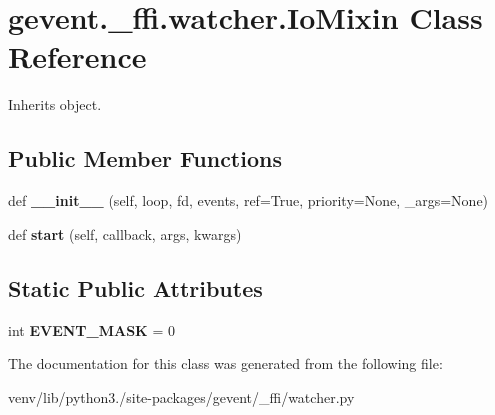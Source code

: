 \hypertarget{classgevent_1_1__ffi_1_1watcher_1_1_io_mixin}{}\section{gevent.\+\_\+ffi.\+watcher.\+Io\+Mixin Class Reference}
\label{classgevent_1_1__ffi_1_1watcher_1_1_io_mixin}


Inherits object.

\subsection*{Public Member Functions}
\begin{DoxyCompactItemize}
\item 
\mbox{\label{classgevent_1_1__ffi_1_1watcher_1_1_io_mixin_afd137e645fcf2e1518c18b41f4f1240f}} 
def {\bfseries \+\_\+\+\_\+init\+\_\+\+\_\+} (self, loop, fd, events, ref=True, priority=None, \+\_\+args=None)
\item 
\mbox{\label{classgevent_1_1__ffi_1_1watcher_1_1_io_mixin_a52928a17ec2c7c8a3ea2f95a5401c2b0}} 
def {\bfseries start} (self, callback, args, kwargs)
\end{DoxyCompactItemize}
\subsection*{Static Public Attributes}
\begin{DoxyCompactItemize}
\item 
\mbox{\label{classgevent_1_1__ffi_1_1watcher_1_1_io_mixin_aa72da470bf98deb6923eed6498c6e8a4}} 
int {\bfseries E\+V\+E\+N\+T\+\_\+\+M\+A\+SK} = 0
\end{DoxyCompactItemize}


The documentation for this class was generated from the following file\+:\begin{DoxyCompactItemize}
\item 
venv/lib/python3./site-\/packages/gevent/\+\_\+ffi/watcher.\+py\end{DoxyCompactItemize}
